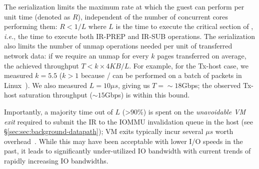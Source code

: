 The serialization limits the maximum rate at which the guest can perform  
  per unit time (denoted as $R$), independent of the number of concurrent cores performing them: 
  $R < 1/L$ where $L$ is the time to execute the critical section of , \textit{i.e.}, the time 
    to execute both IR-PREP and IR-SUB operations. 
The serialization also limits the number of unmap operations 
  needed per unit of transferred network data: if we require an unmap for every $k$ pages transferred on average, 
  the achieved throughput $T < k \times 4KB / L$. For example, for the Tx-host case, 
  we measured $k = 5.5$ ($k>1$ because / can be performed on 
  a batch of packets in Linux~\cite{Rubin2024FastSafe}). 
  We also measured {$L = 10{\mu}s$}, giving us $T = {\sim}18$Gbps; 
  the observed Tx-host saturation throughput (${\sim}15$Gbps) is within this bound. 

Importantly, a majority time out of $L$ (>90\%) is spent on the {\it unavoidable VM exit} 
  required to submit the IR to the IOMMU invalidation queue in the host (see \S\ref{sec:sec:background-datapath}); 
VM exits typically incur several ${\mu}s$ worth overhead~\cite{vmexit1,vmexit2}. 
While this may have been acceptable with lower I/O speeds in the past, 
  it leads to significantly under-utilized IO bandwidth with 
  current trends of rapidly increasing IO bandwidths.  
\fi 




